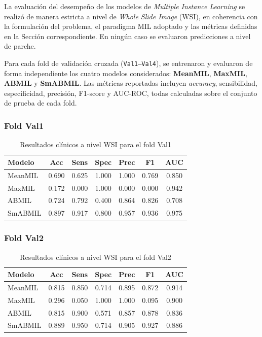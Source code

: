 La evaluación del desempeño de los modelos de \textit{Multiple Instance Learning} se realizó de manera estricta a nivel de \textit{Whole Slide Image} (WSI), en coherencia con la formulación del problema, el paradigma MIL adoptado y las métricas definidas en la Sección correspondiente. En ningún caso se evaluaron predicciones a nivel de parche.\newline

Para cada fold de validación cruzada (\texttt{Val1--Val4}), se entrenaron y evaluaron de forma independiente los cuatro modelos considerados: \textbf{MeanMIL}, \textbf{MaxMIL}, \textbf{ABMIL} y \textbf{SmABMIL}. Las métricas reportadas incluyen \textit{accuracy}, sensibilidad, especificidad, precisión, F1-score y AUC-ROC, todas calculadas sobre el conjunto de prueba de cada fold.

\newpage
\subsubsection*{Fold Val1}

\begin{table}[h!]
\centering
\caption{Resultados clínicos a nivel WSI para el fold Val1}
\begin{tabular}{|l|c|c|c|c|c|c|}
\hline
\textbf{Modelo} & \textbf{Acc} & \textbf{Sens} & \textbf{Spec} & \textbf{Prec} & \textbf{F1} & \textbf{AUC} \\
\hline
MeanMIL & 0.690 & 0.625 & 1.000 & 1.000 & 0.769 & 0.850 \\
MaxMIL  & 0.172 & 0.000 & 1.000 & 0.000 & 0.000 & 0.942 \\
ABMIL   & 0.724 & 0.792 & 0.400 & 0.864 & 0.826 & 0.708 \\
SmABMIL & 0.897 & 0.917 & 0.800 & 0.957 & 0.936 & 0.975 \\
\hline
\end{tabular}
\end{table}

\subsubsection*{Fold Val2}

\begin{table}[h!]
\centering
\caption{Resultados clínicos a nivel WSI para el fold Val2}
\begin{tabular}{|l|c|c|c|c|c|c|}
\hline
\textbf{Modelo} & \textbf{Acc} & \textbf{Sens} & \textbf{Spec} & \textbf{Prec} & \textbf{F1} & \textbf{AUC} \\
\hline
MeanMIL & 0.815 & 0.850 & 0.714 & 0.895 & 0.872 & 0.914 \\
MaxMIL  & 0.296 & 0.050 & 1.000 & 1.000 & 0.095 & 0.900 \\
ABMIL   & 0.815 & 0.900 & 0.571 & 0.857 & 0.878 & 0.836 \\
SmABMIL & 0.889 & 0.950 & 0.714 & 0.905 & 0.927 & 0.886 \\
\hline
\end{tabular}
\end{table}

